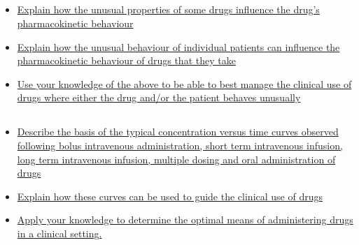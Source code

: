 \documentclass[10pt, a4paper]{article}
\newcommand{\MYhref}[3][blue]{\href{#2}{\color{#1}{#3}}}%
\begin{document}
\subsection{\MYhref[melbBlue]{https://notion.so/dd2ef3af38144ebd88b166f696aaf06c}{Factors that Complicate Pharmacokinetics}} \begin{itemize} \item \href{https://www.notion.so/382898aad24642e7bbe4a6094f0a945a}{Explain how the unusual properties of some drugs influence the drug’s pharmacokinetic behaviour} \item \href{https://www.notion.so/3e3f9b915c264df4aa6f7ae00da78537}{Explain how the unusual behaviour of individual patients can influence the pharmacokinetic behaviour of drugs that they take} \item \href{https://www.notion.so/6f2c0d61468241b69133bba1ea93c7c0}{Use your knowledge of the above to be able to best manage the clinical use of drugs where either the drug and/or the patient behaves unusually} \end{itemize}
\subsection{\MYhref[melbBlue]{https://notion.so/98171afa3f544c69be2366f0e2ec1f96}{Advanced Pharmacokinetics}} \begin{itemize} \item \href{https://www.notion.so/8b55c350de3c42b38755ad48016c8d1b}{Describe the basis of the typical concentration versus time curves observed following bolus intravenous administration, short term intravenous infusion, long term intravenous infusion, multiple dosing and oral administration of drugs} \item \href{https://www.notion.so/fbab835c34fe46e7ac203d1008f8d768}{Explain how these curves can be used to guide the clinical use of drugs} \item \href{https://www.notion.so/52414e8d677d455b8dd7d1408f6cdc0c}{Apply your knowledge to determine the optimal means of administering drugs in a clinical setting.} \end{itemize}
\end{document}
